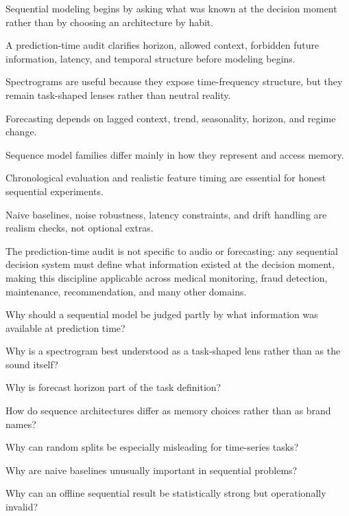 \begin{chaptersummary}
\item Sequential modeling begins by asking what was known at the decision moment rather than by choosing an architecture by habit.
\item A prediction-time audit clarifies horizon, allowed context, forbidden future information, latency, and temporal structure before modeling begins.
\item Spectrograms are useful because they expose time-frequency structure, but they remain task-shaped lenses rather than neutral reality.
\item Forecasting depends on lagged context, trend, seasonality, horizon, and regime change.
\item Sequence model families differ mainly in how they represent and access memory.
\item Chronological evaluation and realistic feature timing are essential for honest sequential experiments.
\item Naive baselines, noise robustness, latency constraints, and drift handling are realism checks, not optional extras.
\item The prediction-time audit is not specific to audio or forecasting: any sequential decision system must define what information existed at the decision moment, making this discipline applicable across medical monitoring, fraud detection, maintenance, recommendation, and many other domains.
\end{chaptersummary}

\begin{studyquestions}
\item Why should a sequential model be judged partly by what information was available at prediction time?
\item Why is a spectrogram best understood as a task-shaped lens rather than as the sound itself?
\item Why is forecast horizon part of the task definition?
\item How do sequence architectures differ as memory choices rather than as brand names?
\item Why can random splits be especially misleading for time-series tasks?
\item Why are naive baselines unusually important in sequential problems?
\item Why can an offline sequential result be statistically strong but operationally invalid?
\end{studyquestions}

